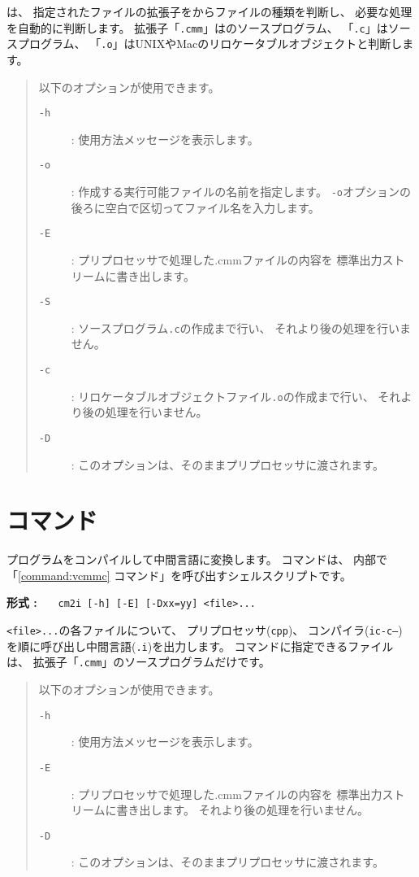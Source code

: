 {\cmc}は、
指定されたファイルの拡張子をからファイルの種類を判断し、
必要な処理を自動的に判断します。
拡張子「{\tt .cmm}」は{\cmml}のソースプログラム、
「{\tt .c}」は{\cl}ソースプログラム、
「{\tt .o}」はUNIXやMacのリロケータブルオブジェクトと判断します。

\begin{quote}
\hspace{-1em}以下のオプションが使用できます。

\begin{description}
\item[{\tt -h}] : 使用方法メッセージを表示します。
\item[{\tt -o}] : 作成する実行可能ファイルの名前を指定します。
{\tt -o}オプションの後ろに空白で区切ってファイル名を入力します。
\item[{\tt -E}] : プリプロセッサで処理した{.cmm}ファイルの内容を
標準出力ストリームに書き出します。
\item[{\tt -S}] : {\cl}ソースプログラム{\tt .c}の作成まで行い、
それより後の処理を行いません。
\item[{\tt -c}] : リロケータブルオブジェクトファイル{\tt .o}の作成まで行い、
それより後の処理を行いません。
\item[{\tt -D}] : このオプションは、そのままプリプロセッサに渡されます。
\end{description}
\end{quote}

\section{{\cmi}コマンド}

{\cmm}プログラムをコンパイルして中間言語に変換します。
{\cmi}コマンドは、
内部で「\ref{command:vcmmc} {\icmmc}コマンド」を呼び出すシェルスクリプトです。

\begin{flushleft}
{\bf 形式 : }~~~\verb/cm2i [-h] [-E] [-Dxx=yy] <file>.../
\end{flushleft}

{\tt <file>...}の各ファイルについて、
プリプロセッサ({\tt cpp})、
コンパイラ({\tt ic-c--})
を順に呼び出し中間言語({\tt .i})を出力します。
{\cmi}コマンドに指定できるファイルは、
拡張子「{\tt .cmm}」の{\cmml}ソースプログラムだけです。

\begin{quote}
\hspace{-1em}以下のオプションが使用できます。

\begin{description}
\item[{\tt -h}] : 使用方法メッセージを表示します。
\item[{\tt -E}] : プリプロセッサで処理した{.cmm}ファイルの内容を
標準出力ストリームに書き出します。
それより後の処理を行いません。
\item[{\tt -D}] : このオプションは、そのままプリプロセッサに渡されます。
\end{description}
\end{quote}

